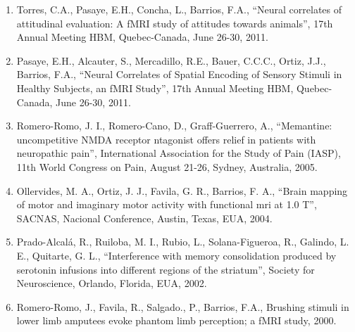 \begin{enumerate}
\item Torres, C.A., Pasaye, E.H., Concha, L., Barrios, F.A., “Neural correlates of attitudinal evaluation: A fMRI study of attitudes towards 
animals”, 17th Annual Meeting HBM, Quebec-Canada, June 26-30, 2011.

\item Pasaye, E.H., Alcauter, S., Mercadillo, R.E., Bauer, C.C.C., Ortiz, J.J., Barrios, F.A., “Neural Correlates of Spatial Encoding of 
Sensory 
Stimuli in Healthy Subjects, an fMRI Study”, 17th Annual Meeting HBM, Quebec-Canada, June 26-30, 2011.

\item Romero-Romo, J. I., Romero-Cano, D., Graff-Guerrero, A., “Memantine: uncompetitive NMDA receptor ntagonist offers relief in patients 
with 
neuropathic pain”, International Association for the Study of Pain (IASP), 11th World Congress on Pain, August 21-26, Sydney, Australia, 
2005.

\item Ollervides, M. A., Ortiz, J. J., Favila, G. R., Barrios, F. A., “Brain mapping of motor and imaginary motor activity with functional 
mri at 
1.0 T”, SACNAS, Nacional Conference, Austin, Texas, EUA, 2004.

\item Prado-Alcalá, R., Ruiloba, M. I., Rubio, L., Solana-Figueroa, R., Galindo, L. E., Quitarte, G. L., “Interference with memory 
consolidation 
produced by serotonin infusions into different regions of the striatum”, Society for Neuroscience, Orlando, Florida, EUA, 2002.

\item Romero-Romo, J., Favila, R., Salgado., P., Barrios, F.A., Brushing stimuli in lower limb amputees evoke phantom limb perception; a fMRI 
study, 2000.

\end{enumerate}


